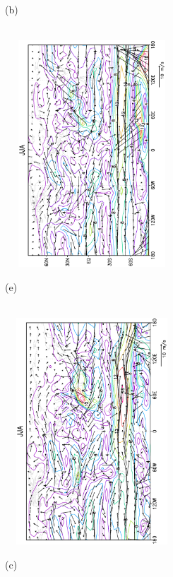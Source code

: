 \documentclass[12pt,a4paper,twoside,openright,headinclude,liststotoc,bibtotoc]{scrreprt}
\begin{document}
\begin{figure}[H]
{}
\parbox{8.5cm}{\hspace{0.50cm}\begin{scriptsize}(b)\end{scriptsize} \vspace{-0.7cm} \\
\includegraphics[height=8.5cm,width=6.5cm,angle=-90]
{eps/uv850JJA.eps}
}
\parbox{8.5cm}{\hspace{0.25cm}\begin{scriptsize}(e)\end{scriptsize} \vspace{-0.7cm} \\
\includegraphics[height=8.5cm,width=6.5cm,angle=-90]
{eps/t21uv850JJA.eps}
}
\parbox{8.5cm}{\hspace{0.50cm}\begin{scriptsize}(c)\end{scriptsize} \vspace{-0.7cm} \\
}
\end{figure}
\end{document}
